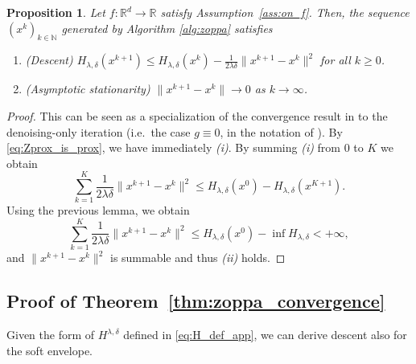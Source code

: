 \documentclass{article}
\newtheorem{proposition}{Proposition}
\newcommand{\R}{\mathbb{R}}
\begin{document}
\begin{proposition}\label{thm:zprox_convergence}
Let $f:\R^d\to \R$ satisfy Assumption~\ref{ass:on_f}. Then, the sequence $(x^k)_{k\in\mathbb{N}}$ generated by
Algorithm \ref{alg:zoppa} satisfies
\begin{enumerate}
\item[(i)] (\emph{Descent}) $H_{\lambda,\delta}(x^{k+1})\le H_{\lambda,\delta}(x^k) - \frac{1}{2\lambda \delta}\|x^{k+1}-x^k\|^2$ for all $k\ge 0$.
\item[(ii)] (\emph{Asymptotic stationarity}) $\|x^{k+1}-x^k\|\to 0$ as $k\to\infty$.
\end{enumerate}
\end{proposition}
\begin{proof}
    This can be seen as a specialization of the convergence result in \cite[Theorem~1]{xu-2020-provable} to the denoising-only iteration  (i.e.\ the case $g\equiv 0$, in the notation of \cite{xu-2020-provable}). By \eqref{eq:Zprox_is_prox}, we have immediately \emph{(i)}. By summing \emph{(i)} from $0$ to $K$ we obtain
    \[\sum_{k=1}^{K} \frac{1}{2\lambda \delta}\|x^{k+1}-x^k\|^2 \leq H_{\lambda,\delta} (x^0) - H_{\lambda,\delta}(x^{K+1}).\]
    Using the previous lemma, we obtain
    \[\sum_{k=1}^{K} \frac{1}{2\lambda \delta}\|x^{k+1}-x^k\|^2 \leq H_{\lambda,\delta} (x^0) - \inf H_{\lambda,\delta} <+\infty,\]
    and $\|x^{k+1}-x^k\|^2$ is summable and thus \emph{(ii)} holds.
\end{proof}

\subsection{Proof of Theorem~\ref{thm:zoppa_convergence}}\label{app:proof_of_zoppa_convergence}

Given the form of $H^{\lambda, \delta}$ defined in \eqref{eq:H_def_app}, we can derive descent also for the soft envelope.
\end{document}
